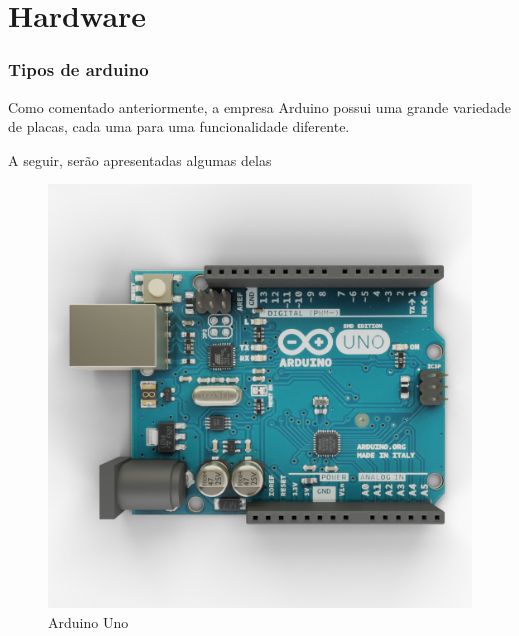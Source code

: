 \documentclass[12pt]{beamer}
\begin{document}
\section{Hardware}
\begin{frame}[allowframebreaks]
    \frametitle{Tipos de arduino}

    Como comentado anteriormente, a empresa Arduino possui uma grande variedade de placas,
    cada uma para uma funcionalidade diferente.
    
    A seguir, serão apresentadas algumas delas

    \framebreak%
    \begin{figure}
        \centering
        \includegraphics[height=.68\textheight]{arduino_uno}
        \caption{Arduino Uno}
    \end{figure}


\end{frame}
\end{document}
